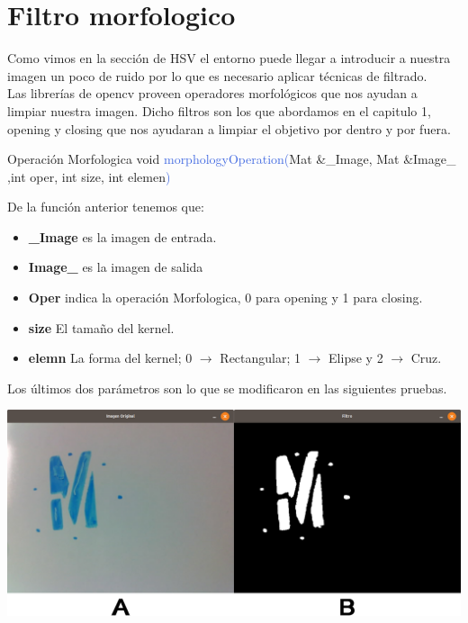 \section{Filtro morfologico}
Como vimos en la sección de HSV el entorno puede llegar a introducir a nuestra
imagen un poco de ruido por lo que es necesario aplicar técnicas de filtrado.\\
Las librerías de opencv proveen operadores morfológicos que nos ayudan a limpiar
nuestra imagen.
Dicho filtros son los que abordamos en el capitulo 1, opening y closing que nos ayudaran
a limpiar el objetivo por dentro y por fuera.
\begin{example}[label={ex:serie}]{Operación Morfologica}
	\textcolor{Mulberry}{void} \textcolor{RoyalBlue}{morphologyOperation(}\textcolor{BurntOrange}{Mat}
	\textcolor{Mulberry}{\&}\textcolor{Bittersweet}{\_Image}, \textcolor{BurntOrange}{Mat} \textcolor{Mulberry}{\&}\textcolor{Bittersweet}{Image\_}
	,\textcolor{Mulberry}{int} \textcolor{Bittersweet}{oper}, \textcolor{Mulberry}{int} \textcolor{Bittersweet}{size},
	\textcolor{Mulberry}{int} \textcolor{Bittersweet}{elemen}\textcolor{RoyalBlue}{)}
\end{example}
De la función anterior tenemos que:
\begin{itemize}
	\item \textbf{\_Image} es la imagen de entrada.
	\item \textbf{Image\_} es la imagen de salida
	\item \textbf{Oper} indica la operación Morfologica, 0 para opening y 1 para closing.
	\item \textbf{size} El tamaño del kernel.
	\item \textbf{elemn} La forma del kernel; 0 $\rightarrow$ Rectangular; 1 $\rightarrow$ Elipse y
	      2 $\rightarrow$ Cruz.
\end{itemize}
Los últimos dos parámetros son lo que se modificaron en las siguientes pruebas.
\begin{center}
	\includegraphics[width=0.7 \textwidth]{Contenido/Cuerpo/Capitulo4/Fig16.eps}
	\label{Fig9}
\end{center}
